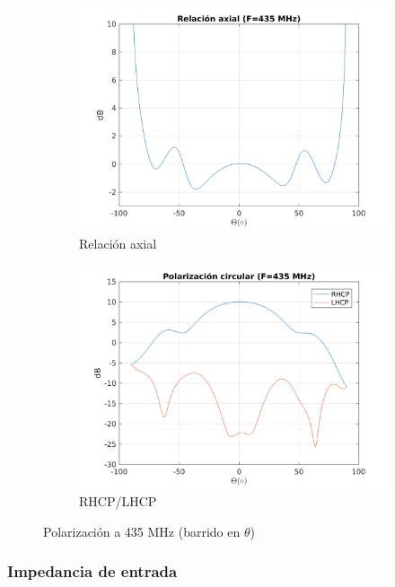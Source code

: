 \documentclass[12pt]{article}
\begin{document}
\begin{figure}[!h]
	\centering
	\begin{subfigure}{.45\textwidth}
		\centering
		\includegraphics[width=1.1\linewidth]{helix_1_F435_AR.png}
		\caption{Relación axial}
	\end{subfigure}%
	\begin{subfigure}{.45\textwidth}
		\centering
		\includegraphics[width=1.1\linewidth]{helix_1_F435_CP.png}
		\caption{RHCP/LHCP}
	\end{subfigure}
	\caption{Polarización a 435 MHz (barrido en $\theta$)}
\end{figure}

\subsubsection*{Impedancia de entrada}
\end{document}
